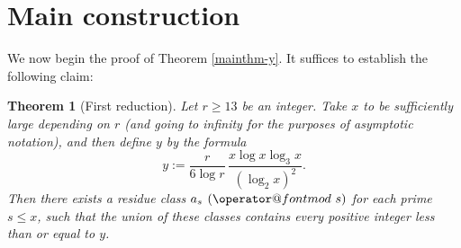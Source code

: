 \documentclass[11pt]{amsart}
\makeatletter
\numberwithin{equation}{section}  %
\theoremstyle{remark}
\theoremstyle{plain}
\newtheorem{thm}{Theorem}
\numberwithin{equation}{section}
\renewcommand{\pmod}[1]{\allowbreak\mkern7mu({\operator@font mod}\,\,#1)}
\newcommand{\be}{\begin{equation}}
\newcommand{\ee}{\end{equation}}
\renewcommand{\le}{\leqslant}
\renewcommand{\leq}{\leqslant}
\renewcommand{\geq}{\geqslant}
\renewcommand{\(}{\left(}
\renewcommand{\)}{\right)}
\newcommand{\pfrac}[2]{\left(\frac{#1}{#2}\right)}  %
\newcommand{\asym}{\sim}   %
\newcommand{\PP}{\mathcal{P}}
\newcommand{\QQ}{\mathcal{Q}}
\makeatother
\begin{document}
\begin{comment}
\begin{proof}
By Lemma \ref{second}, there is a subset $\QQ$ of the primes from $(x/4,y]$
such that
\begin{equation}
\label{cardQ}
|\QQ| \asym \frac{y}{\log x}
\end{equation}
such that for all $q\in\QQ$ and $i\in \{ 0,\dots,r-1\}$ we have
\begin{equation}
\label{cardP(q)}
|\{p \in \PP : \; q-ir!p\in\QQ(p)\}| \asym \alpha_r\frac{x}{2(\log x)^r}.
\end{equation}
Write
\[ \Sigma := \sum_{i=0}^{r-1}\sum_{q\in(x/4,y]}\big(|\{ p \in \PP : \;q-ir!p\in\QQ(p)\}|
-|\PP_0(q,i)|\big).\]
Then $\Sigma$ counts the triples $(i,p,q)$ for which $p \in P$, $q \in (x/4,y]$, $q- ir! p \in Q(p)$ but for which either $p \notin P_0$ or $q - ir! p \notin Q_0(p)$. Consequently we have the estimate
\[ \Sigma \leq r |\PP \setminus \PP_0| \max_{p \in \PP} |\QQ(p)| + r \sum_{p \in \PP} |\QQ(p) \setminus \QQ_0(p)|.\]

By~(\ref{cardP}) and Lemma~\ref{sieve1} we have
$$|\PP \setminus \PP_0| \max_{p \in \PP}|\QQ(p)|=
o\pfrac{xy}{(\log x)^{r+1}},$$
and by \eqref{compareQ(p)_Q0(p)},
$$\sum_{p\in(x/2,x]}|\QQ(p)\setminus\QQ_0(p)| \ll_r
\frac{xy}{(\log x)^{r+2}}.$$
It follows that 
$$\Sigma=o\left(\frac{xy}{(\log x)^{r+1}}\right).$$ Therefore for all but $o(y/\log x)$ exceptional values of $q \in Q$ we have
\[ \sum_{i = 0}^{r-1} \big(|\{ p \in \PP : \;q-ir!p\in\QQ(p)\}|
-|\PP_0(q,i)|\big) = o\pfrac{x}{(\log x)^r}.\]
Taking $Q_0$ to consist of all the non-exceptional values of $q$ gives the result.
\end{proof}
Finally, for future reference, we observe that for $i<i'$ the condition
$q-i'r!p\in\QQ_0(p)$ implies $p\not\in\PP_0(q,i)$. Hence,
\begin{equation}\label{nonintersec}
\PP_0(q,i)\cap\PP_0(q,i')=\emptyset \qquad (i\ne i').
\end{equation}
\end{comment}

%
\section{Main construction}
%

We now begin the proof of Theorem \ref{mainthm-y}.  It suffices to establish the following claim:

\begin{thm}[First reduction]\label{first-red} Let $r \geq 13$ be an integer.  Take $x$ to be sufficiently large depending on $r$ (and going to infinity for the purposes of asymptotic notation), and then define $y$ by the formula
\be\label{ydef}
y := \frac{r}{6\log r}\, \frac{x\log x\log_3 x}{(\log_2 x)^2}.
\ee
Then there exists a residue class $a_s \pmod s$ for each
prime $s\le x$, such that the union of these classes
contains every positive integer less than or equal to $y$.
\end{thm}
\end{document}
